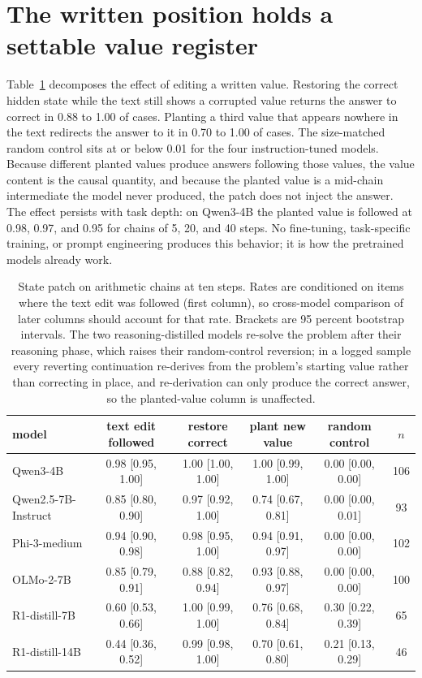 \documentclass{article}
\begin{document}
\section{The written position holds a settable value register}
\label{sec:register}

Table~\ref{tab:patch} decomposes the effect of editing a written value. Restoring the correct hidden state while the text still shows a corrupted value returns the answer to correct in 0.88 to 1.00 of cases. Planting a third value that appears nowhere in the text redirects the answer to it in 0.70 to 1.00 of cases. The size-matched random control sits at or below 0.01 for the four instruction-tuned models. Because different planted values produce answers following those values, the value content is the causal quantity, and because the planted value is a mid-chain intermediate the model never produced, the patch does not inject the answer. The effect persists with task depth: on Qwen3-4B the planted value is followed at 0.98, 0.97, and 0.95 for chains of 5, 20, and 40 steps. No fine-tuning, task-specific training, or prompt engineering produces this behavior; it is how the pretrained models already work.

\begin{table}[t]
\centering
\small
\caption{State patch on arithmetic chains at ten steps. Rates are conditioned on items where the text edit was followed (first column), so cross-model comparison of later columns should account for that rate. Brackets are 95 percent bootstrap intervals. The two reasoning-distilled models re-solve the problem after their reasoning phase, which raises their random-control reversion; in a logged sample every reverting continuation re-derives from the problem's starting value rather than correcting in place, and re-derivation can only produce the correct answer, so the planted-value column is unaffected.}
\label{tab:patch}
\begin{tabular}{lccccc}
\toprule
model & text edit followed & restore correct & plant new value & random control & $n$ \\
\midrule
Qwen3-4B & 0.98 [0.95, 1.00] & 1.00 [1.00, 1.00] & 1.00 [0.99, 1.00] & 0.00 [0.00, 0.00] & 106 \\
Qwen2.5-7B-Instruct & 0.85 [0.80, 0.90] & 0.97 [0.92, 1.00] & 0.74 [0.67, 0.81] & 0.00 [0.00, 0.01] & 93 \\
Phi-3-medium & 0.94 [0.90, 0.98] & 0.98 [0.95, 1.00] & 0.94 [0.91, 0.97] & 0.00 [0.00, 0.00] & 102 \\
OLMo-2-7B & 0.85 [0.79, 0.91] & 0.88 [0.82, 0.94] & 0.93 [0.88, 0.97] & 0.00 [0.00, 0.00] & 100 \\
R1-distill-7B & 0.60 [0.53, 0.66] & 1.00 [0.99, 1.00] & 0.76 [0.68, 0.84] & 0.30 [0.22, 0.39] & 65 \\
R1-distill-14B & 0.44 [0.36, 0.52] & 0.99 [0.98, 1.00] & 0.70 [0.61, 0.80] & 0.21 [0.13, 0.29] & 46 \\
\bottomrule
\end{tabular}
\end{table}
\end{document}
